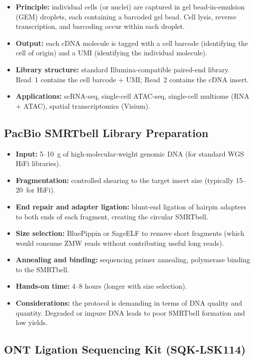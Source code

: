\begin{itemize}[nosep]
  \item \textbf{Principle:} individual cells (or nuclei) are captured in gel bead-in-emulsion (GEM) droplets, each containing a barcoded gel bead. Cell lysis, reverse transcription, and barcoding occur within each droplet.
  \item \textbf{Output:} each cDNA molecule is tagged with a cell barcode (identifying the cell of origin) and a UMI (identifying the individual molecule).
  \item \textbf{Library structure:} standard Illumina-compatible paired-end library. Read~1 contains the cell barcode + UMI; Read~2 contains the cDNA insert.
  \item \textbf{Applications:} \gls{scRNA-seq}, single-cell ATAC-seq, single-cell multiome (RNA + ATAC), spatial transcriptomics (Visium).
\end{itemize}

\subsection{PacBio SMRTbell Library Preparation}

\begin{itemize}[nosep]
  \item \textbf{Input:} 5--10~\textmu g of high-molecular-weight genomic DNA (for standard WGS HiFi libraries).
  \item \textbf{Fragmentation:} controlled shearing to the target insert size (typically 15--20\kilobase\ for HiFi).
  \item \textbf{End repair and adapter ligation:} blunt-end ligation of hairpin adapters to both ends of each fragment, creating the circular SMRTbell.
  \item \textbf{Size selection:} BluePippin or SageELF to remove short fragments (which would consume ZMW reads without contributing useful long reads).
  \item \textbf{Annealing and binding:} sequencing primer annealing, polymerase binding to the SMRTbell.
  \item \textbf{Hands-on time:} 4--8 hours (longer with size selection).
  \item \textbf{Considerations:} the protocol is demanding in terms of DNA quality and quantity. Degraded or impure DNA leads to poor SMRTbell formation and low yields.
\end{itemize}

\subsection{ONT Ligation Sequencing Kit (SQK-LSK114)}


